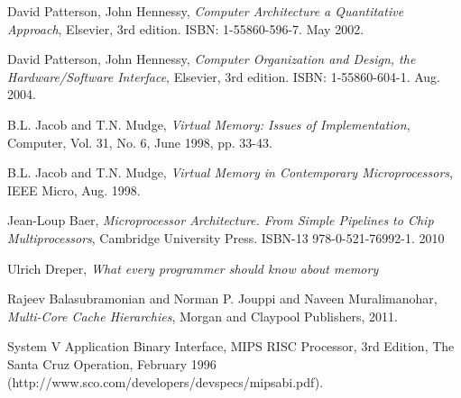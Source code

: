 \documentclass[9pt,a4paper]{article}
\begin{document}
\begin{thebibliography}{9}

    David Patterson, John Hennessy, \textit{Computer Architecture a Quantitative Approach}, Elsevier, 3rd edition. ISBN: 1-55860-596-7. May 2002.  
  

    David Patterson, John Hennessy, \textit{Computer Organization and Design, the Hardware/Software Interface},  Elsevier, 3rd edition. ISBN: 1-55860-604-1. Aug. 2004. 
    

    B.L. Jacob and T.N. Mudge, \textit{Virtual Memory: Issues of Implementation}, Computer, Vol. 31, No. 6, June 1998, pp. 33-43.


    B.L. Jacob and T.N. Mudge, \textit{Virtual Memory in Contemporary Microprocessors}, IEEE Micro, Aug. 1998.
    

    Jean-Loup Baer, \textit{Microprocessor Architecture. From Simple Pipelines to Chip Multiprocessors}, Cambridge University Press. ISBN-13 978-0-521-76992-1. 2010

    
    Ulrich Dreper, \textit {What every programmer should know about memory}

    
    Rajeev Balasubramonian and Norman P. Jouppi and Naveen Muralimanohar, \textit{Multi-Core Cache Hierarchies}, Morgan and Claypool Publishers, 2011.
    
    
    System V Application Binary Interface, MIPS RISC Processor, 3rd Edition, The Santa Cruz Operation, February 1996 (http://www.sco.com/developers/devspecs/mipsabi.pdf).
\end{thebibliography}
\end{document}
